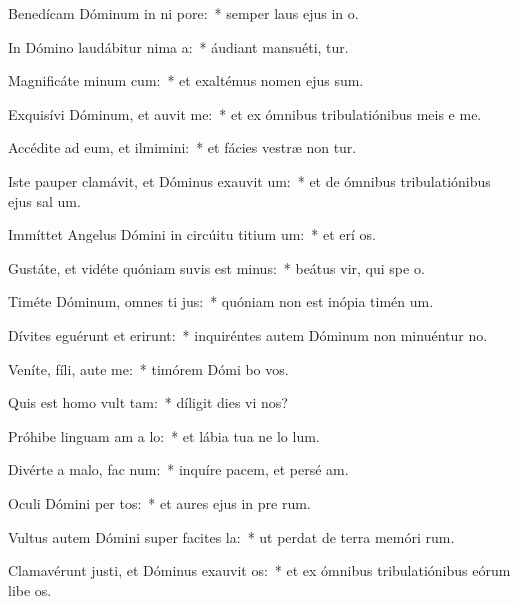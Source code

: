 \item Benedícam Dóminum in ni pore:~* semper laus ejus in  o.
\item In Dómino laudábitur nima a:~* áudiant mansuéti,  tur.
\item Magnificáte minum cum:~* et exaltémus nomen ejus  sum.
\item Exquisívi Dóminum, et auvit me:~* et ex ómnibus tribulatiónibus meis e me.
\item Accédite ad eum, et ilmimini:~* et fácies vestræ non tur.
\item Iste pauper clamávit, et Dóminus exauvit um:~* et de ómnibus tribulatiónibus ejus sal um.
\item Immíttet Angelus Dómini in circúitu titium um:~* et erí os.
\item Gustáte, et vidéte quóniam suvis est minus:~* beátus vir, qui spe  o.
\item Timéte Dóminum, omnes ti jus:~* quóniam non est inópia timén um.
\item Dívites eguérunt et erirunt:~* inquiréntes autem Dóminum non minuéntur  no.
\item Veníte, fíli, aute me:~* timórem Dómi bo vos.
\item Quis est homo  vult tam:~* díligit dies vi nos?
\item Próhibe linguam am a lo:~* et lábia tua ne lo lum.
\item Divérte a malo,  fac num:~* inquíre pacem, et persé am.
\item Oculi Dómini per tos:~* et aures ejus in pre rum.
\item Vultus autem Dómini super facites la:~* ut perdat de terra memóri rum.
\item Clamavérunt justi, et Dóminus exauvit os:~* et ex ómnibus tribulatiónibus eórum libe os.
